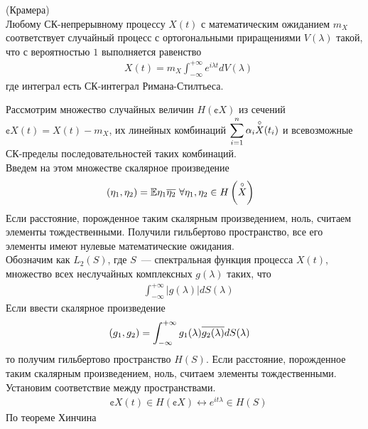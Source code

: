 \newpage 
{}
\begin{theorem} (Крамера)
\\
Любому СК-непрерывному процессу $X(t)$ с математическим ожиданием $m_X$
соответствует случайный процесс с ортогональными приращениями $V(\lambda)$
такой, что с вероятностью $1$ выполняется равенство
\begin{align*}
  & X(t) = m_X \int_{-\infty}^{+\infty} e^{i\lambda t}dV(\lambda)
\end{align*}
где интеграл есть СК-интеграл Римана-Стилтьеса.
\end{theorem}
\begin{Proof}
    Рассмотрим множество случайных величин $H\left(\cent{X}\right)$ из сечений
    $\cent{X}(t) = X(t)-m_X$, их линейных комбинаций $\displaystyle
    \sum_{i=1}^n\alpha_i\overset{\circ}{X}(t_i)$ и всевозможные СК-пределы
    последовательностей таких комбинаций.
    \\
    Введем на этом множестве скалярное произведение
    \begin{align*}
      & \left(\eta_1, \eta_2\right) = \EE \eta_1\oL{\eta_2} \ \forall \eta_1, \eta_2 \in H \left(\cent{X}\right)
    \end{align*}
    Если расстояние, порожденное таким скалярным произведением, ноль, считаем
    элементы тождественными. Получили гильбертово пространство, все его элементы
    имеют нулевые математические ожидания.
    \\
    Обозначим как $L_2(S)$, где $S$~--- спектральная функция процесса $X(t)$,
    множество всех неслучайных комплексных $g(\lambda)$ таких, что
    \begin{align*}
      & \int_{-\infty}^{+\infty}\left| g(\lambda) \right|dS(\lambda)
    \end{align*}
    Если ввести скалярное произведение
    \begin{align*}
      & (g_1,g_2) = \int_{-\infty}^{+\infty} g_1(\lambda)\overline{g_2(\lambda)}dS(\lambda)
    \end{align*}
    то получим гильбертово пространство $H(S)$. Если расстояние, порожденное
    таким скалярным произведением, ноль, считаем элементы тождественными.
    \\
    Установим соответствие между пространствами.
    \begin{align*}
      & \cent{X}(t) \in H \left( \cent{X} \right) \leftrightarrow e^{i t \lambda} \in H(S)
    \end{align*}
    По теореме Хинчина
    \begin{align*}

\end{align*}
\end{Proof}
